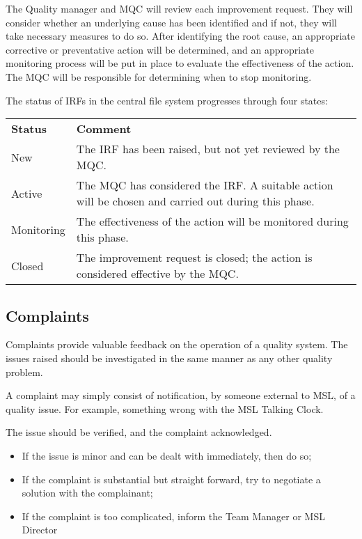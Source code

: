 The Quality manager and MQC will review each improvement request. They will consider whether an underlying cause has been identified and if not, they will take necessary measures to do so. After identifying the root cause, an appropriate corrective or preventative action will be determined, and an appropriate monitoring process will be put in place to evaluate the effectiveness of the action.  The MQC will be responsible for determining when to stop monitoring.

The status of IRFs in the central file system progresses through four states:
\begin{center}
{\renewcommand*{\arraystretch}{1.4}
\begin{tabular}{p{14.07em}p{25em}}
	\rowcolor[rgb]{ 0,  0,  0} 
	\textcolor[rgb]{ 1,  1,  1}{\textbf{Status}} & 
	\textcolor[rgb]{ 1,  1,  1}{\textbf{Comment}} \\
New & The IRF has been raised, but not yet reviewed by the MQC. \\ 
Active & The MQC has considered the IRF. A suitable action will be chosen and carried out during this phase. \\ 
Monitoring & The effectiveness of the action will be monitored during this phase. \\ 
Closed & The improvement request is closed; the action is considered effective by the MQC. \\ 
\hline 
\end{tabular} 
}
\end{center}

\subsection{Complaints}
\label{ss:complaints}
Complaints provide valuable feedback on the operation of a quality system. The issues raised should be investigated in the same manner as any other quality problem. 

A complaint may simply consist of notification, by someone external to MSL, of a quality issue. For example, something wrong with the MSL Talking Clock. 

The issue should be verified, and the complaint acknowledged.
\begin{itemize}
\item If the issue is minor and can be dealt with immediately, then do so;
\item If the complaint is substantial but straight forward, try to negotiate a solution with the complainant;
\item If the complaint is too complicated, inform the Team Manager or MSL Director
\end{itemize}

